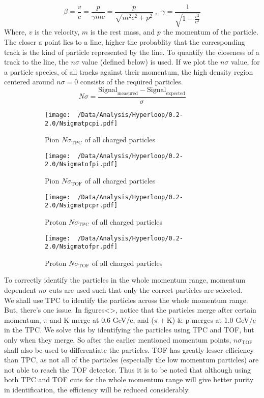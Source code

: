 \documentclass[12pt,a4paper,twoside]{report}
\begin{document}
\begin{equation}
	\beta=\frac{v}{c}=\frac{p}{\gamma mc}=\frac{p}{\sqrt{m^2c^2+p^2}}\ , \ \
	\gamma=\frac{1}{\sqrt{1-\frac{v^2}{c^2}}}
\end{equation}
Where, $v$ is the velocity, $m$ is the rest mass, and $p$ the momentum of the particle.
\\

The closer a point lies to a line, higher the probablity that the corresponding track is the kind of particle represented by the line. To quantify the closeness of a track to the line, the $n\sigma$ value (defined below) is used. If we plot the $n\sigma$ value, for a particle species, of all tracks against their momentum, the high density region centered around $n\sigma=0$ consists of the required particles.
\begin{equation}
	N\sigma=\frac{\mathrm{Signal}_\mathrm{measured}-\mathrm{Signal}_\mathrm{expected}}{\sigma}
\end{equation}
\begin{figure}[H]
	\begin{subfigure}{0.49\linewidth}
		\texttt{[image: ~/Data/Analysis/Hyperloop/0.2-2.0/Nsigmatpcpi.pdf]}
		\caption{Pion $N\sigma_\mathrm{TPC}$ of all charged particles}
	\end{subfigure}
	\begin{subfigure}{0.49\linewidth}
		\texttt{[image: ~/Data/Analysis/Hyperloop/0.2-2.0/Nsigmatofpi.pdf]}
		\caption{Pion $N\sigma_\mathrm{TOF}$ of all charged particles}
	\end{subfigure}
	\begin{subfigure}{0.49\linewidth}
		\texttt{[image: ~/Data/Analysis/Hyperloop/0.2-2.0/Nsigmatpcpr.pdf]}
		\caption{Proton $N\sigma_\mathrm{TPC}$ of all charged particles}
	\end{subfigure}
	\begin{subfigure}{0.49\linewidth}
		\texttt{[image: ~/Data/Analysis/Hyperloop/0.2-2.0/Nsigmatofpr.pdf]}
		\caption{Proton $N\sigma_\mathrm{TOF}$ of all charged particles}
	\end{subfigure}
	\caption{}
\end{figure}
To correctly identify the particles in the whole momentum range, momentum dependent $n\sigma$ cuts are used such that only the correct particles are selected.\\
We shall use TPC to identify the particles across the whole momentum range. But, there's one issue. In figures<>, notice that the particles merge after certain momentum, $\pi$ and K merge at 0.6 GeV/c, and ($\pi+\mathrm{K}$) \& p merges at 1.0 GeV/c in the TPC. We solve this by identifying the particles using TPC and TOF, but only when they merge. So after the earlier mentioned momentum points, $n\sigma_\mathrm{TOF}$ shall also be used to differentiate the particles. TOF has greatly lesser efficiency than TPC, as not all of the particles (especially the low momentum particles) are not able to reach the TOF detector. Thus it is to be noted that although using both TPC and TOF cuts for the whole momentum range will give better purity in identification, the efficiency will be reduced considerably.
\end{document}
